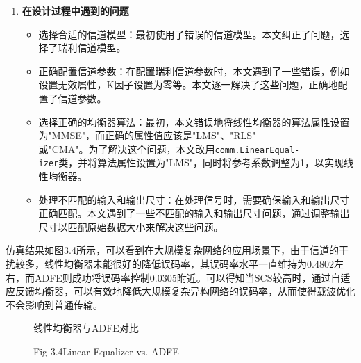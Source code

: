 \documentclass[UTF8,a4paper,12pt]{ctexart}
\numberwithin{equation}{section}
\begin{document}
\begin{enumerate}
		\item \textbf{在设计过程中遇到的问题}
		\begin{itemize}
			\item 选择合适的信道模型：最初使用了错误的信道模型。本文纠正了问题，选择了瑞利信道模型。
			\item 正确配置信道参数：在配置瑞利信道参数时，本文遇到了一些错误，例如设置无效属性，K因子设置为零等。本文逐一解决了这些问题，正确地配置了信道参数。
			\item 选择正确的均衡器算法：最初，本文错误地将线性均衡器的算法属性设置为"MMSE"，而正确的属性值应该是"LMS"、"RLS"\\或"CMA"。为了解决这个问题，本文改用\texttt{comm.LinearEqual-\\izer}类，并将算法属性设置为"LMS"，同时将参考系数调整为1，以实现线性均衡器。
			\item 处理不匹配的输入和输出尺寸：在处理信号时，需要确保输入和输出尺寸正确匹配。本文遇到了一些不匹配的输入和输出尺寸问题，通过调整输出尺寸以匹配原始数据大小来解决这些问题。
		\end{itemize}
	\end{enumerate}
	
	仿真结果如图3.4所示，可以看到在大规模复杂网络的应用场景下，由于信道的干扰较多，线性均衡器未能很好的降低误码率，其误码率水平一直维持为0.4802左右，而ADFE则成功将误码率控制0.0305附近。可以得知当SCS较高时，通过自适应反馈均衡器，可以有效地降低大规模复杂异构网络的误码率，从而使得载波优化不会影响到普通传输。
	\begin{figure}[H] 
		\caption{线性均衡器与ADFE对比}
		\vspace{-10pt}
		\caption*{Fig 3.4\quad Linear Equalizer vs. ADFE}
	\end{figure}
	
\end{document}
